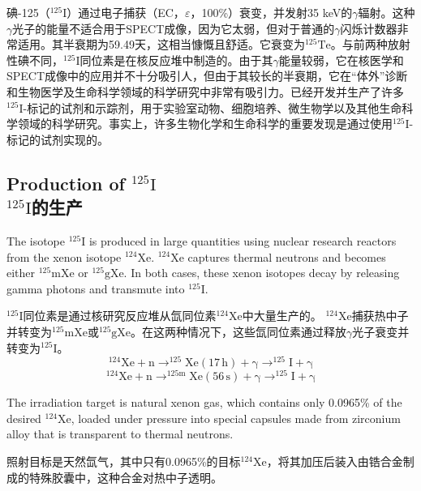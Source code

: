 \documentclass[dvipsnames, svgnames,a4paper,11pt]{article}
\begin{document}
碘-125（\(\mathrm{^{125}I}\)）通过电子捕获（EC，\(\varepsilon\)，100\%）衰变，并发射35 keV的$\gamma$辐射。这种$\gamma$光子的能量不适合用于SPECT成像，因为它太弱，但对于普通的$\gamma$闪烁计数器非常适用。其半衰期为59.49天，这相当慷慨且舒适。它衰变为\(\mathrm{^{125}Te}\)。与前两种放射性碘不同，\(\mathrm{^{125}I}\)同位素是在核反应堆中制造的。由于其$\gamma$能量较弱，它在核医学和SPECT成像中的应用并不十分吸引人，但由于其较长的半衰期，它在“体外”诊断和生物医学及生命科学领域的科学研究中非常有吸引力。已经开发并生产了许多\(\mathrm{^{125}I}\)-标记的试剂和示踪剂，用于实验室动物、细胞培养、微生物学以及其他生命科学领域的科学研究。事实上，许多生物化学和生命科学的重要发现是通过使用\(\mathrm{^{125}I}\)-标记的试剂实现的。



\subsection{Production of \(\mathrm{^{125}I}\)\\ \(\mathrm{^{125}I}\)的生产}

The isotope \(\mathrm{^{125}I}\) is produced in large quantities using nuclear research reactors from the xenon isotope \(\mathrm{^{124}Xe}\). \(\mathrm{^{124}Xe}\) captures thermal neutrons and becomes either \(\mathrm{^{125}mXe}\) or \(\mathrm{^{125}gXe}\). In both cases, these xenon isotopes decay by releasing gamma photons and transmute into \(\mathrm{^{125}I}\).

\(\mathrm{^{125}I}\)同位素是通过核研究反应堆从氙同位素\(\mathrm{^{124}Xe}\)中大量生产的。 \(\mathrm{^{124}Xe}\)捕获热中子并转变为\(\mathrm{^{125}mXe}\)或\(\mathrm{^{125}gXe}\)。在这两种情况下，这些氙同位素通过释放$\gamma$光子衰变并转变为\(\mathrm{^{125}I}\)。
\[
\mathrm{^{124}Xe + n \rightarrow ^{125}Xe (17 \,h) + \gamma \rightarrow ^{125}I + \gamma}
\]
\[
\mathrm{^{124}Xe + n \rightarrow ^{125m}Xe (56 \,s) + \gamma \rightarrow ^{125}I + \gamma}
\]

The irradiation target is natural xenon gas, which contains only 0.0965\% of the desired \(\mathrm{^{124}Xe}\), loaded under pressure into special capsules made from zirconium alloy that is transparent to thermal neutrons.

照射目标是天然氙气，其中只有0.0965\%的目标\(\mathrm{^{124}Xe}\)，将其加压后装入由锆合金制成的特殊胶囊中，这种合金对热中子透明。
\end{document}
